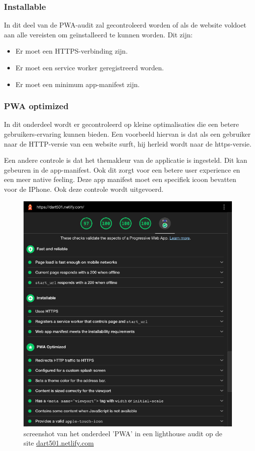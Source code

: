 	
	\subsubsection{Installable}
	
		In dit deel van de PWA-audit zal gecontroleerd worden of als de website voldoet aan alle vereisten om geïnstalleerd te kunnen worden. Dit zijn:
		\begin{itemize}
			\item	Er moet een HTTPS-verbinding zijn.
			\item	Er moet een service worker geregistreerd worden.
			\item	Er moet een minimum app-manifest zijn.
		\end{itemize}
		\autocite{web.dev2020a}
		
	
	\subsubsection{PWA optimized}
	
		In dit onderdeel wordt er gecontroleerd op kleine optimalisaties die een betere gebruikers-ervaring kunnen bieden. 
		Een voorbeeld hiervan is dat als een gebruiker naar de HTTP-versie van een website surft, hij herleid wordt naar de https-versie.
		
		Een andere controle is dat het themakleur van de applicatie is ingesteld. Dit kan gebeuren in de app-manifest. Ook dit zorgt voor een betere user experience en een meer native feeling. Deze app manifest moet een specifiek icoon bevatten voor de IPhone. Ook deze controle wordt uitgevoerd.
		
		
		\begin{figure}[H]
			\centering
			\includegraphics{./img/lighthouse.png}
			\caption{screenshot van het onderdeel 'PWA' in een lighthouse audit op de site \href{ https://dart501.netlify.com}{dart501.netlify.com} }
		\end{figure}
		
